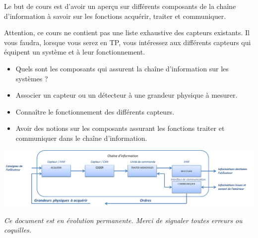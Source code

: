 \documentclass[10pt]{article}
\begin{document}
Le but de cours est d'avoir un aperçu sur différents composants de la chaîne d'information à savoir sur les fonctions acquérir, traiter et communiquer.

Attention, ce cours ne contient pas une liste exhaustive des capteurs existants. Il vous faudra, lorsque vous serez en TP, vous intéressez aux différents capteurs qui équipent un système et à leur fonctionnement.



\begin{prob}
\begin{itemize}
\item Quels sont les composants qui assurent la chaîne d'information sur les systèmes ?
\end{itemize}
\end{prob}

\begin{savoir}
\begin{itemize}
\item Associer un capteur ou un détecteur à une grandeur physique à mesurer.
\item Connaître le fonctionnement des différents capteurs.
\item Avoir des notions sur les composants assurant les fonctions traiter et communiquer dans le chaîne d'information.
\end{itemize}
\end{savoir}

\begin{center}
    \includegraphics[width=.9\textwidth]{images/ch_info_2}
  \end{center}



\setlength{\parskip}{0ex plus 0.2ex minus 0ex}
 \renewcommand{\contentsname}{}
 \renewcommand{\baselinestretch}{1}

\tableofcontents

 \renewcommand{\baselinestretch}{1.2}
\setlength{\parskip}{2ex plus 0.5ex minus 0.2ex}

\textit{Ce document est en évolution permanente. Merci de signaler toutes
erreurs ou coquilles.}
\end{document}
